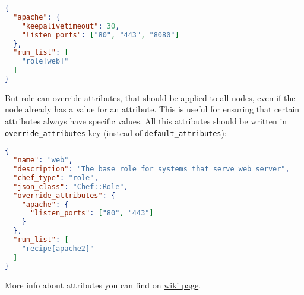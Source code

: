 \begin{lstlisting}[language=JSON,label=lst:my-cloud-attributes3]
{
  "apache": {
    "keepalivetimeout": 30,
    "listen_ports": ["80", "443", "8080"]
  },
  "run_list": [
    "role[web]"
  ]
}
\end{lstlisting}

But role can override attributes, that should be applied to all nodes, even if the node already has a value for an attribute. This is useful for ensuring that certain attributes always have specific values. All this attributes should be written in \lstinline!override_attributes! key (instead of \lstinline!default_attributes!):

\begin{lstlisting}[language=JSON,label=lst:my-cloud-attributes2]
{
  "name": "web",
  "description": "The base role for systems that serve web server",
  "chef_type": "role",
  "json_class": "Chef::Role",
  "override_attributes": {
    "apache": {
      "listen_ports": ["80", "443"]
    }
  },
  "run_list": [
    "recipe[apache2]"
  ]
}
\end{lstlisting}

More info about attributes you can find on \href{http://docs.opscode.com/chef_overview_attributes.html}{wiki page}.
